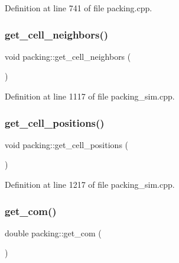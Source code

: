 Definition at line 741 of file packing.\+cpp.

\mbox{\label{classpacking_a51875315e1e8c16a5dfc9e3807fcff17}} 
\subsubsection{\texorpdfstring{get\+\_\+cell\+\_\+neighbors()}{get\_cell\_neighbors()}}
{\footnotesize\ttfamily void packing\+::get\+\_\+cell\+\_\+neighbors (\begin{DoxyParamCaption}{ }\end{DoxyParamCaption})}



Definition at line 1117 of file packing\+\_\+sim.\+cpp.

\mbox{\label{classpacking_ad9908dd91b3969dc8a5de39d8fcf66e3}} 
\subsubsection{\texorpdfstring{get\+\_\+cell\+\_\+positions()}{get\_cell\_positions()}}
{\footnotesize\ttfamily void packing\+::get\+\_\+cell\+\_\+positions (\begin{DoxyParamCaption}{ }\end{DoxyParamCaption})}



Definition at line 1217 of file packing\+\_\+sim.\+cpp.

\mbox{\label{classpacking_a654616abad6b4e39903bf1c2f4953c8a}} 
\subsubsection{\texorpdfstring{get\+\_\+com()}{get\_com()}}
{\footnotesize\ttfamily double packing\+::get\+\_\+com (\begin{DoxyParamCaption}{ }\end{DoxyParamCaption})}



